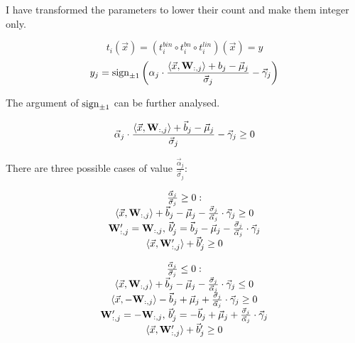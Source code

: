 \documentclass{fithesis}
\begin{document}
I have transformed the parameters to lower their count and make them integer only.

\begin{equation*}
    t_i(\vec x) = (t_i^{bin} \circ t_i^{bn} \circ t_i^{lin})(\vec x) = y
\end{equation*}
\begin{equation*}
    y_j = \mathrm{sign}_{\pm 1}\left( \alpha_j \cdot \frac{\langle \vec x, \mathbf{W}_{:, j}\rangle + b_j - \vec \mu_j}{\vec \sigma_j} - \vec \gamma_j \right)
\end{equation*}

The argument of $\mathrm{sign}_{\pm 1}$ can be further analysed.

\begin{equation*}
    \vec \alpha_j \cdot \frac{\langle \vec x, \mathbf{W}_{:, j}\rangle + \vec b_j - \vec \mu_j}{\vec \sigma_j} - \vec \gamma_j \geq 0
\end{equation*}

There are three possible cases of value $\frac{\vec \alpha_j}{\vec \sigma_j}$:

\begin{equation*}
    \begin{matrix}
        \frac{\vec\alpha_j}{\vec\sigma_j} \geq 0: \\
        \langle \vec x, \mathbf{W}_{:, j}\rangle + \vec b_j - \vec \mu_j - \frac{\vec \sigma_j}{\vec\alpha_j}\cdot \vec \gamma_j \geq 0\\
        \mathbf{W}'_{:, j} = \mathbf{W}_{:, j}, \,
        \vec b'_j = \vec b_j - \vec\mu_j - \frac{\vec\sigma_j}{\vec\alpha_j}\cdot \vec\gamma_j\\
        \langle \vec x, \mathbf{W}'_{:, j}\rangle + \vec b'_j \geq 0\\
    \end{matrix}
\end{equation*}

\begin{equation*}
    \begin{matrix}
        \frac{\vec\alpha_j}{\vec\sigma_j} \leq 0: \\
        \langle \vec x, \mathbf{W}_{:, j}\rangle + \vec b_j - \vec \mu_j - \frac{\vec \sigma_j}{\vec\alpha_j}\cdot \vec \gamma_j \leq 0 \\
        \langle \vec x, -\mathbf{W}_{:, j}\rangle - \vec b_j + \vec \mu_j + \frac{\vec \sigma_j}{\vec\alpha_j}\cdot \vec \gamma_j \geq 0\\
        \mathbf{W}'_{:, j} = -\mathbf{W}_{:, j}, \,
        \vec b'_j = -\vec b_j + \vec\mu_j + \frac{\vec\sigma_j}{\vec\alpha_j}\cdot \vec\gamma_j\\
        \langle \vec x, \mathbf{W}'_{:, j}\rangle + \vec b'_j \geq 0\\
    \end{matrix}
\end{equation*}
\end{document}
